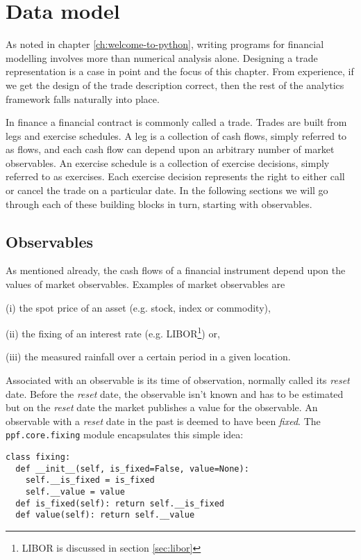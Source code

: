 \chapter{Data model}\label{ch:data-model}

As noted in chapter \ref{ch:welcome-to-python}, writing programs for
financial modelling involves more than numerical analysis alone. Designing 
a trade representation is a case in point and the focus of this
chapter. From experience, if we get the design of the trade
description correct, then the rest of the analytics framework falls
naturally into place.

In finance a financial contract is commonly called a trade. Trades are
built from legs and exercise schedules. A leg is a collection of cash
flows, simply referred to as flows, and each cash flow can depend upon
an arbitrary number of market observables. An exercise schedule is a
collection of exercise decisions, simply referred to as exercises. Each 
exercise decision represents the right to either call or cancel the  
trade on a particular date. In the following sections we will go 
through each of these building blocks in turn, starting with observables.

\section{Observables}

As mentioned already, the cash flows of a financial instrument depend
upon the values of market observables. Examples of market observables
are
\begin{inparaenum}
\item[(i)]{the spot price of an asset (e.g. stock, index or commodity)}, 
\item[(ii)]{the fixing of an interest rate (e.g. LIBOR\footnote{LIBOR
is discussed in section \ref{sec:libor}})} or,
\item[(iii)]{the measured rainfall over a certain period in a given location.}
\end{inparaenum}
Associated with an observable is its time of observation, normally
called its \emph{reset} date. Before the \emph{reset} date, the observable 
isn't known and has to be estimated but on the \emph{reset} date the market 
publishes a value for the observable. An observable with a \emph{reset} date in the
past is deemed to have been \emph{fixed}. The \verb|ppf.core.fixing|
module encapsulates this simple idea:
\begin{verbatim}
class fixing:
  def __init__(self, is_fixed=False, value=None):
    self.__is_fixed = is_fixed
    self.__value = value
  def is_fixed(self): return self.__is_fixed
  def value(self): return self.__value
\end{verbatim}

